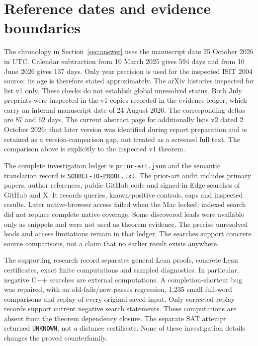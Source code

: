 \documentclass[11pt]{article}
\theoremstyle{definition}\newtheorem{definition}[theorem]{Definition}
\begin{document}
\appendix

\clearpage
\section{Reference dates and evidence boundaries}\label{app:references}
The chronology in Section~\ref{sec:answer} uses the manuscript date
25 October 2026 in UTC. Calendar subtraction from 10 March 2025 gives
594 days and from 10 June 2026 gives 137 days. Only year precision is
used for the inspected ISIT 2004 source; its age is therefore stated
approximately. The arXiv histories inspected for \cite{RDV,FHM} list
v1 only. These checks do not establish global unresolved status.
Both July preprints were inspected in the v1 copies recorded in the
evidence ledger, which carry an internal manuscript date of 24 August
2026. The corresponding deltas are 87 and 62 days. The current abstract
page for \cite{Bhardwaj} additionally lists v2 dated 2 October 2026;
that later version was identified during report preparation and is
retained as a version-comparison gap, not treated as a screened full text.
The comparison above is explicitly to the inspected v1 theorem.

The complete investigation ledger is
\href{../prior-art.json}{\texttt{prior-art.json}} and the semantic
translation record is \href{../SOURCE-TO-PROOF.txt}{\texttt{SOURCE-TO-PROOF.txt}}.
The prior-art audit includes primary papers, author references, public
GitHub code and signed-in Edge searches of GitHub and X. It records
queries, known-positive controls, caps and inspected results. Later
native-browser access failed when the Mac locked; indexed search
did not replace complete native coverage. Some discovered leads
were available only as snippets and were not used as theorem evidence.
The precise unresolved leads and access limitations remain in that
ledger. The searches support concrete source comparisons, not a
claim that no earlier result exists anywhere.

The supporting research record separates general Lean proofs, concrete
Lean certificates, exact finite computations and sampled diagnostics.
In particular, negative C++ searches are external computations. A
completion-shortcut bug was repaired, with an old-fails/new-passes
regression, 1,235 small full-word comparisons and replay of every
original saved input. Only corrected replay records support current
negative search statements. These computations are absent from the
theorem dependency closure. The separate SAT attempt returned
\texttt{UNKNOWN}, not a distance certificate. None of these
investigation details changes the proved counterfamily.
\end{document}

